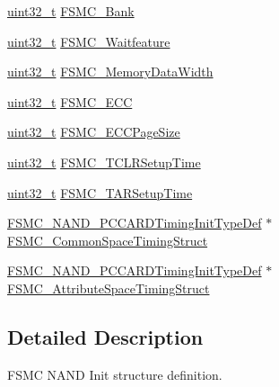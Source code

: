 \begin{DoxyCompactItemize}
\item 
\hyperlink{stdint_8h_a435d1572bf3f880d55459d9805097f62}{uint32\-\_\-t} \hyperlink{struct_f_s_m_c___n_a_n_d_init_type_def_a60d3ead2188e1dbdf06810e952b3ce0f}{F\-S\-M\-C\-\_\-\-Bank}
\item 
\hyperlink{stdint_8h_a435d1572bf3f880d55459d9805097f62}{uint32\-\_\-t} \hyperlink{struct_f_s_m_c___n_a_n_d_init_type_def_ab350e15014c4a9f4b2c2f2848f11eeca}{F\-S\-M\-C\-\_\-\-Waitfeature}
\item 
\hyperlink{stdint_8h_a435d1572bf3f880d55459d9805097f62}{uint32\-\_\-t} \hyperlink{struct_f_s_m_c___n_a_n_d_init_type_def_ab4a4f56aab3150d8fb02aaf092db0235}{F\-S\-M\-C\-\_\-\-Memory\-Data\-Width}
\item 
\hyperlink{stdint_8h_a435d1572bf3f880d55459d9805097f62}{uint32\-\_\-t} \hyperlink{struct_f_s_m_c___n_a_n_d_init_type_def_a58d0510c0ce0ae3d1e3863bf8f571377}{F\-S\-M\-C\-\_\-\-E\-C\-C}
\item 
\hyperlink{stdint_8h_a435d1572bf3f880d55459d9805097f62}{uint32\-\_\-t} \hyperlink{struct_f_s_m_c___n_a_n_d_init_type_def_a7ed6a25710ba724a7a8f90af60130cf6}{F\-S\-M\-C\-\_\-\-E\-C\-C\-Page\-Size}
\item 
\hyperlink{stdint_8h_a435d1572bf3f880d55459d9805097f62}{uint32\-\_\-t} \hyperlink{struct_f_s_m_c___n_a_n_d_init_type_def_a633c7be46a1d281916b9f2e34fa3d36a}{F\-S\-M\-C\-\_\-\-T\-C\-L\-R\-Setup\-Time}
\item 
\hyperlink{stdint_8h_a435d1572bf3f880d55459d9805097f62}{uint32\-\_\-t} \hyperlink{struct_f_s_m_c___n_a_n_d_init_type_def_a014c1b8977b454ac15654d93dbb7dff9}{F\-S\-M\-C\-\_\-\-T\-A\-R\-Setup\-Time}
\item 
\hyperlink{struct_f_s_m_c___n_a_n_d___p_c_c_a_r_d_timing_init_type_def}{F\-S\-M\-C\-\_\-\-N\-A\-N\-D\-\_\-\-P\-C\-C\-A\-R\-D\-Timing\-Init\-Type\-Def} $\ast$ \hyperlink{struct_f_s_m_c___n_a_n_d_init_type_def_a8ec59d3e29ae3206301ec47d63dfc7ad}{F\-S\-M\-C\-\_\-\-Common\-Space\-Timing\-Struct}
\item 
\hyperlink{struct_f_s_m_c___n_a_n_d___p_c_c_a_r_d_timing_init_type_def}{F\-S\-M\-C\-\_\-\-N\-A\-N\-D\-\_\-\-P\-C\-C\-A\-R\-D\-Timing\-Init\-Type\-Def} $\ast$ \hyperlink{struct_f_s_m_c___n_a_n_d_init_type_def_a586c3d691f1d786510cc75bf2b164f42}{F\-S\-M\-C\-\_\-\-Attribute\-Space\-Timing\-Struct}
\end{DoxyCompactItemize}


\subsection{Detailed Description}
F\-S\-M\-C N\-A\-N\-D Init structure definition. 

